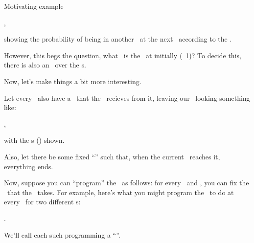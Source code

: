 \documentclass{rl_theory/rl_theory}
\begin{document}
\begin{part} {Motivating example}
\begin{itemize}
\begin{center}
,
      \end{center}
  \end{itemize}
  showing the probability of 
  being in another \til\ at 
  the next \stp\ according to the \trd.

  However, this begs the question, 
  what \til\ is the \agt\ at initially (\stp\ 1)? 
  To decide this, there is also an \ind\ over the \til{}s.

  \newpage
  Now, let's make things a bit more interesting. 

  Let every \til\ also have a \rwd\ that 
  the \agt\ recieves from it, 
  leaving our \brd\ looking something like:

  \begin{center}
    ,
  \end{center}
  with the \rwd{}s 
  () shown.

  Also, let there be some fixed ``\lmt'' such that,
  when the current \stp\ reaches it, everything ends.

  Now, suppose you can ``program'' the \agt\ as follows: 
  for every \til\ and \stp, you can fix the \act\ that the \agt\ takes.
  For example, here's what you might program the \agt\ to do 
  at every \til\ for two different \stp{}s:
  \begin{center}
    \hspace{1cm}
    .
  \end{center}
  We'll call each such programming a ``\str''. 


\end{part}
\end{document}
